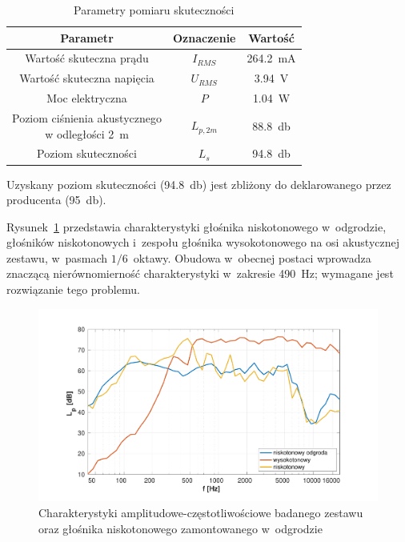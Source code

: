 \documentclass[12pt]{oska}
\begin{document}
	\begin{table}[!ht]
		\centering
		\caption{Parametry pomiaru skuteczności}
		\label{t:skutecznosc}
		\begin{tabular}{|c|c|c|}
			\hline
			\textbf{Parametr} & \textbf{Oznaczenie} & \textbf{Wartość} \\\hline
			Wartość skuteczna prądu & $I_{RMS}$ & \SI{264,2}{\milli\ampere} \\\hline
			Wartość skuteczna napięcia & $U_{RMS}$ & \SI{3,94}{\volt} \\\hline
			Moc elektryczna & $P$ & \SI{1,04}{\watt} \\\hline
			\makecell{Poziom ciśnienia akustycznego\\w odległości \SI{2}{\metre}} & $L_{p,2m}$ & \SI{88,8}{\decibel} \\\hline
			Poziom skuteczności & $L_{s}$ & \SI{94,8}{\decibel} \\\hline
		\end{tabular}
	\end{table}
	
	Uzyskany poziom skuteczności (\SI{94,8}{\decibel}) jest zbliżony do deklarowanego przez producenta (\SI{95}{\decibel}).
	
	Rysunek~\ref{r:skutecznosc} przedstawia charakterystyki głośnika niskotonowego w~odgrodzie, głośników niskotonowych i~zespołu głośnika wysokotonowego na osi akustycznej zestawu, w~pasmach $1/6$~oktawy. Obudowa w~obecnej postaci wprowadza znaczącą nierównomierność charakterystyki w~zakresie \SI{490}{\hertz}; wymagane jest rozwiązanie tego problemu.
	
	\begin{figure}[!ht]
		\centering
		\includegraphics[width=.8\textwidth,trim={2cm .5cm 2cm 1cm},clip]{skutecznosci_stolik.pdf}
		\caption{Charakterystyki amplitudowe-częstotliwościowe badanego zestawu  oraz głośnika niskotonowego zamontowanego w~odgrodzie}
		\label{r:skutecznosc}
	\end{figure}
	
\end{document}
